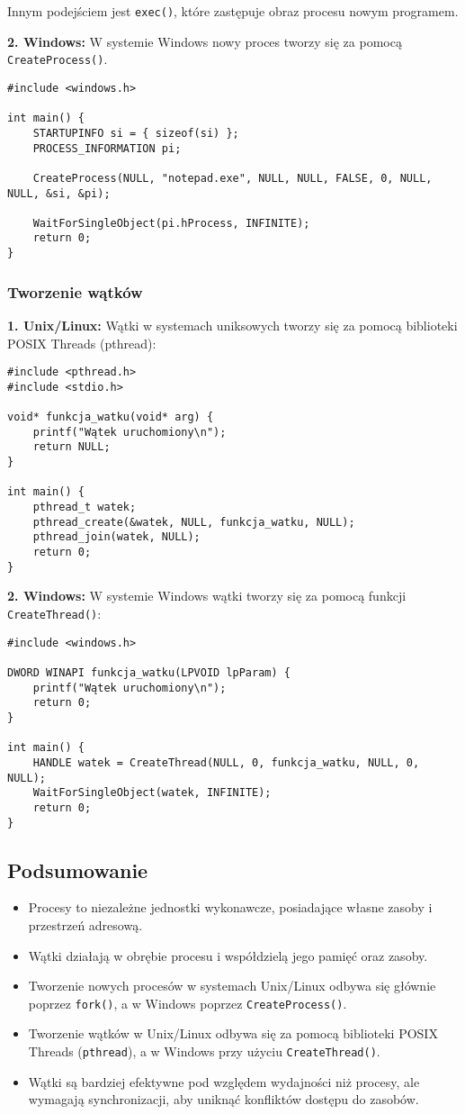 Innym podejściem jest \texttt{exec()}, które zastępuje obraz procesu nowym programem.

\textbf{2. Windows:}  
W systemie Windows nowy proces tworzy się za pomocą \texttt{CreateProcess()}.
\begin{verbatim}
#include <windows.h>

int main() {
    STARTUPINFO si = { sizeof(si) };
    PROCESS_INFORMATION pi;

    CreateProcess(NULL, "notepad.exe", NULL, NULL, FALSE, 0, NULL, NULL, &si, &pi);

    WaitForSingleObject(pi.hProcess, INFINITE);
    return 0;
}
\end{verbatim}

\subsubsection{Tworzenie wątków}

\textbf{1. Unix/Linux:}  
Wątki w systemach uniksowych tworzy się za pomocą biblioteki POSIX Threads (pthread):
\begin{verbatim}
#include <pthread.h>
#include <stdio.h>

void* funkcja_watku(void* arg) {
    printf("Wątek uruchomiony\n");
    return NULL;
}

int main() {
    pthread_t watek;
    pthread_create(&watek, NULL, funkcja_watku, NULL);
    pthread_join(watek, NULL);
    return 0;
}
\end{verbatim}

\textbf{2. Windows:}  
W systemie Windows wątki tworzy się za pomocą funkcji \texttt{CreateThread()}:
\begin{verbatim}
#include <windows.h>

DWORD WINAPI funkcja_watku(LPVOID lpParam) {
    printf("Wątek uruchomiony\n");
    return 0;
}

int main() {
    HANDLE watek = CreateThread(NULL, 0, funkcja_watku, NULL, 0, NULL);
    WaitForSingleObject(watek, INFINITE);
    return 0;
}
\end{verbatim}

\subsection{Podsumowanie}
\begin{itemize}
    \item Procesy to niezależne jednostki wykonawcze, posiadające własne zasoby i przestrzeń adresową.
    \item Wątki działają w obrębie procesu i współdzielą jego pamięć oraz zasoby.
    \item Tworzenie nowych procesów w systemach Unix/Linux odbywa się głównie poprzez \texttt{fork()}, a w Windows poprzez \texttt{CreateProcess()}.
    \item Tworzenie wątków w Unix/Linux odbywa się za pomocą biblioteki POSIX Threads (\texttt{pthread}), a w Windows przy użyciu \texttt{CreateThread()}.
    \item Wątki są bardziej efektywne pod względem wydajności niż procesy, ale wymagają synchronizacji, aby uniknąć konfliktów dostępu do zasobów.
\end{itemize}